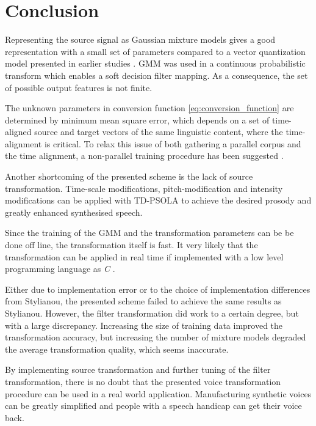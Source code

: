 \chapter{Conclusion} %
\label{cha:conclusion}
Representing the source signal as Gaussian mixture models gives a good representation with a small set of parameters compared to a vector quantization model presented in earlier studies \cite{abe88}. GMM was used in a continuous probabilistic transform which enables a soft decision filter mapping. As a consequence, the set of possible output features is not finite.

The unknown parameters in conversion function \eqref{eq:conversion_function} are determined by minimum mean square error, which depends on a set of time-aligned source and target vectors of the same linguistic content, where the time-alignment is critical. To relax this issue of both gathering a parallel corpus and the time alignment, a non-parallel training procedure has been suggested \cite{mouchtaris06,ye06}.

Another shortcoming of the presented scheme is the lack of source transformation. Time-scale modifications, pitch-modification and intensity modifications can be applied with \eg TD-PSOLA to achieve the desired prosody and greatly enhanced synthesised speech.

Since the training of the GMM and the transformation parameters can be be done off line, the transformation itself is fast. It very likely that the transformation can be applied in real time if implemented with a low level programming language as \emph{C} \cite{kernighan88}. 

Either due to implementation error or to the choice of implementation differences from Stylianou, the presented scheme failed to achieve the same results as Stylianou. However, the filter transformation did work to a certain degree, but with a large discrepancy. Increasing the size of training data improved the transformation accuracy, but increasing the number of mixture models degraded the average transformation quality, which seems inaccurate.

By implementing source transformation and further tuning of the filter transformation, there is no doubt that the presented voice transformation procedure can be used in a real world application. Manufacturing synthetic voices can be greatly simplified and people with a speech handicap can get their voice back.

